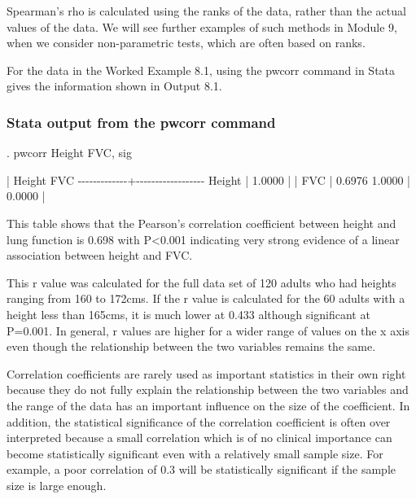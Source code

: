 \documentclass[
]{memoir}
\newenvironment{Shaded}{\begin{snugshade}}{\end{snugshade}}
\newcommand{\NormalTok}[1]{#1}
\begin{document}
 

Spearman's rho is calculated using the ranks of the data, rather than the actual values of the data. We will see further examples of such methods in Module 9, when we consider non-parametric tests, which are often based on ranks.

For the data in the Worked Example 8.1, using the pwcorr command in Stata gives the information shown in Output 8.1.

\hypertarget{stata-output-from-the-pwcorr-command}{%
\subsubsection{Stata output from the pwcorr command}\label{stata-output-from-the-pwcorr-command}}

\begin{Shaded}
\begin{Highlighting}[]
\NormalTok{. pwcorr Height FVC, sig}

\NormalTok{             |   Height      FVC}
\NormalTok{{-}{-}{-}{-}{-}{-}{-}{-}{-}{-}{-}{-}{-}+{-}{-}{-}{-}{-}{-}{-}{-}{-}{-}{-}{-}{-}{-}{-}{-}{-}{-}}
\NormalTok{      Height |   1.0000 }
\NormalTok{             |}
\NormalTok{             |}
\NormalTok{         FVC |   0.6976   1.0000 }
\NormalTok{             |   0.0000}
\NormalTok{             |}
\end{Highlighting}
\end{Shaded}

This table shows that the Pearson's correlation coefficient between height and lung function is 0.698 with P\textless0.001 indicating very strong evidence of a linear association between height and FVC.

This r value was calculated for the full data set of 120 adults who had heights ranging from 160 to 172cms. If the r value is calculated for the 60 adults with a height less than 165cms, it is much lower at 0.433 although significant at P=0.001. In general, r values are higher for a wider range of values on the x axis even though the relationship between the two variables remains the same.

Correlation coefficients are rarely used as important statistics in their own right because they do not fully explain the relationship between the two variables and the range of the data has an important influence on the size of the coefficient. In addition, the statistical significance of the correlation coefficient is often over interpreted because a small correlation which is of no clinical importance can become statistically significant even with a relatively small sample size. For example, a poor correlation of 0.3 will be statistically significant if the sample size is large enough.
\end{document}

